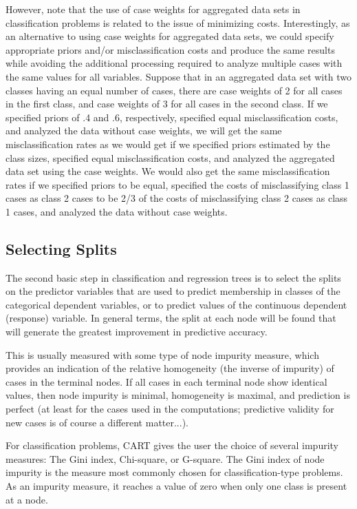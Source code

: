 However, note that the use of case weights for aggregated data sets in classification problems is related to the issue of minimizing costs. Interestingly, as an alternative to using case weights for aggregated data sets, we could specify appropriate priors and/or misclassification costs and produce the same results while avoiding the additional processing required to analyze multiple cases with the same values for all variables. Suppose that in an aggregated data set with two classes having an equal number of cases, there are case weights of 2 for all cases in the first class, and case weights of 3 for all cases in the second class. If we specified priors of .4 and .6, respectively, specified equal misclassification costs, and analyzed the data without case weights, we will get the same misclassification rates as we would get if we specified priors estimated by the class sizes, specified equal misclassification costs, and analyzed the aggregated data set using the case weights. We would also get the same misclassification rates if we specified priors to be equal, specified the costs of misclassifying class 1 cases as class 2 cases to be 2/3 of the costs of misclassifying class 2 cases as class 1 cases, and analyzed the data without case weights.

\subsection{Selecting Splits}

The second basic step in classification and regression trees is to select the splits on the predictor variables that are used to predict membership in classes of the categorical dependent variables, or to predict values of the continuous dependent (response) variable. In general terms, the split at each node will be found that will generate the greatest improvement in predictive accuracy. 

This is usually measured with some type of node impurity measure, which provides an indication of the relative homogeneity (the inverse of impurity) of cases in the terminal nodes. If all cases in each terminal node show identical values, then node impurity is minimal, homogeneity is maximal, and prediction is perfect (at least for the cases used in the computations; predictive validity for new cases is of course a different matter...).

For classification problems, CART gives the user the choice of several impurity measures: The Gini index, Chi-square, or G-square. The Gini index of node impurity is the measure most commonly chosen for classification-type problems. As an impurity measure, it reaches a value of zero when only one class is present at a node. 

